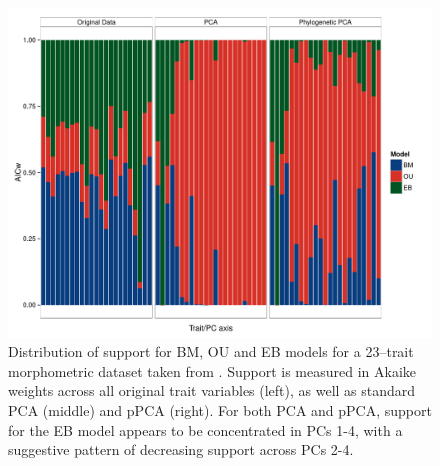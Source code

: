 \documentclass[12pt,twoside]{article}
\begin{document}
\begin{figure}[p]
\centering
\includegraphics[scale=0.65]{./fig/anoles_aicw.pdf}
\caption[Model support on the \emph{Anolis} dataset]{Distribution of support for BM, OU and EB models for a 23--trait morphometric dataset taken from \citet{Mahler2010}. Support is measured in Akaike weights across all original trait variables (left), as well as standard PCA (middle) and pPCA (right). For both PCA and pPCA, support for the EB model appears to be concentrated in PCs 1-4, with a suggestive pattern of decreasing support across PCs 2-4. }
\label{anoles_aicw}
\end{figure}
\end{document}
